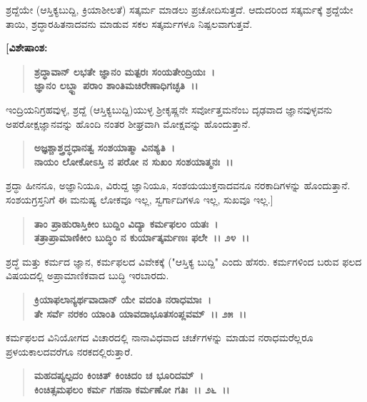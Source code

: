 ಶ್ರದ್ದೆಯೇ (ಆಸ್ತಿಕ್ಯಬುದ್ದಿ, ಕ್ರಿಯಾಶೀಲತೆ) ಸತ್ಕರ್ಮ ಮಾಡಲು ಪ್ರಚೋದಿಸುತ್ತದೆ. ಆದುದರಿಂದ ಸತ್ಕರ್ಮಕ್ಕೆ ಶ್ರದ್ದೆಯೇ ತಾಯಿ, ಶ್ರದ್ಧಾರಹಿತನಾದವನು ಮಾಡುವ ಸಕಲ ಸತ್ಕರ್ಮಗಳೂ ನಿಷ್ಪಲವಾಗುತ್ತವೆ.

\begin{flushleft}
\textbf{[ವಿಶೇಷಾಂಶ:}
\end{flushleft}

\begin{verse}
\textbf{ಶ್ರದ್ಧಾವಾನ್ ಲಭತೇ ಜ್ಞಾನಂ ಮತ್ಪರಃ ಸಂಯತೇಂದ್ರಿಯಃ~।}\\\textbf{ಜ್ಞಾನಂ ಲಬ್ಧ್ಬಾ ಪರಾಂ ಶಾಂತಿಮಚಿರೇಣಾಧಿಗಚ್ಛತಿ~।।} 
\end{verse}

ಇಂದ್ರಿಯನಿಗ್ರಹವುಳ್ಳ, ಶ್ರದ್ದೆ (ಆಸ್ತಿಕ್ಯಬುದ್ದಿ)ಯುಳ್ಳ ಶ‍್ರೀಕೃಷ್ಣನೇ ಸರ್ವೋತ್ತಮನೆಂಬ ದೃಢವಾದ ಜ್ಞಾನವುಳ್ಳವನು ಅಪರೋಕ್ಷಜ್ಞಾನವನ್ನು ಹೊಂದಿ ನಂತರ ಶೀಘ್ರವಾಗಿ ಮೋಕ್ಷವನ್ನು ಹೊಂದುತ್ತಾನೆ.

\begin{verse}
\textbf{ಅಜ್ಞಶ್ಚಾಶ್ತ್ರದ್ಧಧಾನತ್ವ ಸಂಶಯಾತ್ಮಾ ವಿನಶ್ಯತಿ~।}\\\textbf{ನಾಯಂ ಲೋಕೋಽಸ್ತಿ ನ ಪರೋ ನ ಸುಖಂ ಸಂಶಯಾತ್ಮನಃ~।।} 
\end{verse}

ಶ್ರದ್ಧಾ ಹೀನನೂ, ಅಜ್ಞಾನಿಯೂ, ವಿರುದ್ದ ಜ್ಞಾನಿಯೂ, ಸಂಶಯಯುಕ್ತನಾದವನೂ ನರಕಾದಿಗಳನ್ನು ಹೊಂದುತ್ತಾನೆ. ಸಂಶಯಗ್ರಸ್ತನಿಗೆ ಈ ಮನುಷ್ಯ ಲೋಕವೂ ಇಲ್ಲ, ಸ್ವರ್ಗಾದಿಗಳೂ ಇಲ್ಲ, ಸುಖವೂ ಇಲ್ಲ.]

\begin{verse}
\textbf{ತಾಂ ಪ್ರಾಹುರಾಸ್ತಿಕೀಂ ಬುದ್ದಿಂ ವಿದ್ಯಾ ಕರ್ಮಫಲಂ ಯತಃ~।}\\\textbf{ತತ್ರಾಪ್ರಾಮಾಣಿಕೀಂ ಬುದ್ಧಿಂ ನ ಕುರ್ಯಾತ್ಕರ್ಮಣಃ ಫಲೇ~।। ೨೪~।।}
\end{verse}

ಶ್ರದ್ಧೆ ಮತ್ತು ಕರ್ಮದ ಜ್ಞಾನ, ಕರ್ಮಫಲದ ವಿವೇಕಕ್ಕೆ ("ಆಸ್ತಿಕ್ಯ ಬುದ್ದಿ" ಎಂದು ಹೆಸರು. ಕರ್ಮಗಳಿಂದ ಬರುವ ಫಲದ ವಿಷಯದಲ್ಲಿ ಅಪ್ರಾಮಾಣಿಕವಾದ ಬುದ್ಧಿ ಇರಬಾರದು.

\begin{verse}
\textbf{ಕ್ರಿಯಾಫಲಾನ್ಯರ್ಥವಾದಾನ್ ಯೇ ವದಂತಿ ನರಾಧಮಾಃ~।}\\\textbf{ತೇ ಸರ್ವೆ ನರಕಂ ಯಾಂತಿ ಯಾವದಾಭೂತಸಂಪ್ಲವಮ್~।। ೨೫~।।}
\end{verse}

ಕರ್ಮಫಲದ ವಿನಿಯೋಗದ ವಿಚಾರದಲ್ಲಿ ನಾನಾವಿಧವಾದ ಚರ್ಚೆಗಳನ್ನು ಮಾಡುವ ನರಾಧಮರೆಲ್ಲರೂ ಪ್ರಳಯಕಾಲದವರೆಗೂ ನರಕದಲ್ಲಿರುತ್ತಾರೆ.

\begin{verse}
\textbf{ಮಹದಪ್ಯಲ್ಪದಂ ಕಿಂಚಿತ್ ಕಿಂಚಿದಂ ಚ ಭೂರಿದಮ್~।}\\\textbf{ಕಿಂಚಿತ್ಸಮಫಲಂ ಕರ್ಮ ಗಹನಾ ಕರ್ಮಣೋ ಗತಿಃ~।। ೨೬~।।}
\end{verse}

